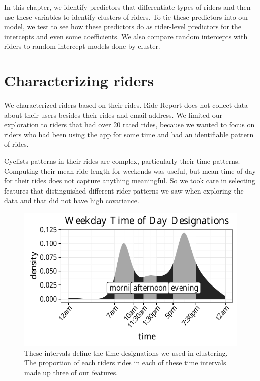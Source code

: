 \documentclass[12pt,twoside]{reedthesis}
\begin{document}
  In this chapter, we identify predictors that differentiate types of
  riders and then use these variables to identify clusters of riders. To
  tie these predictors into our model, we test to see how these predictors
  do as rider-level predictors for the intercepts and even some
  coefficients. We also compare random intercepts with riders to random
  intercept models done by cluster.
  
  \section{Characterizing riders}\label{characterizing-riders}
  
  We characterized riders based on their rides. Ride Report does not
  collect data about their users besides their rides and email address. We
  limited our exploration to riders that had over 20 rated rides, because
  we wanted to focus on riders who had been using the app for some time
  and had an identifiable pattern of rides.
  
  Cyclists patterns in their rides are complex, particularly their time
  patterns. Computing their mean ride length for weekends was useful, but
  mean time of day for their rides does not capture anything meaningful.
  So we took care in selecting features that distinguished different rider
  patterns we saw when exploring the data and that did not have high
  covariance.
  
  \begin{figure}[htb]
  \centering
  \includegraphics{figure/time-designations.pdf}
  \caption{These intervals define the time designations we used in clustering. 
  The proportion of each riders rides in each of these time intervals made up three
  of our features.\label{fig:time-splits}}
  \end{figure}
  
\end{document}
